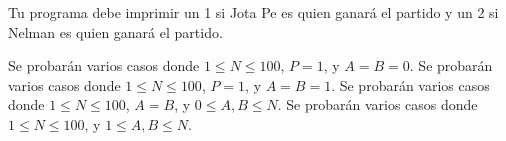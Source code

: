 \documentclass{oci}
\begin{document}
\begin{outputDescription}
  Tu programa debe imprimir un 1 si Jota Pe es quien ganará el partido y un 2 si Nelman es quien ganará el partido.
\end{outputDescription}



\begin{scoreDescription}
   Se probarán varios casos donde $1 \le N \le 100$, $P=1$, y $A=B=0$.
   Se probarán varios casos donde $1 \le N \le 100$, $P=1$, y $A=B=1$.
   Se probarán varios casos donde $1 \le N \le 100$, $A=B$, y $0\le A,B \le N$.
   Se probarán varios casos donde $1 \le N \le 100$, y $1 \le A, B \le N$.
\end{scoreDescription}

\begin{sampleDescription}
\end{sampleDescription}
\end{document}
